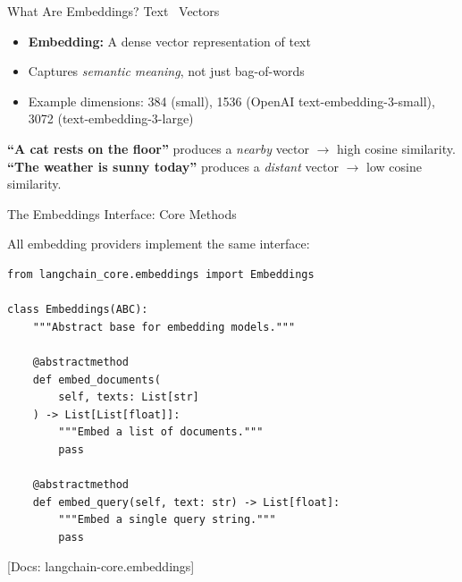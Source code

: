 \documentclass[aspectratio=169,11pt]{beamer}
\newcommand{\docref}[1]{{\scriptsize\color{docgray}[Docs: #1]}}
\begin{document}
\begin{frame}{What Are Embeddings? Text \textrightarrow\ Vectors}
  \begin{itemize}
    \setlength{\itemsep}{1pt}
    \item \textbf{Embedding:} A dense vector representation of text
    \item Captures \emph{semantic meaning}, not just bag-of-words
    \item Example dimensions: 384 (small), 1536 (OpenAI text-embedding-3-small), 3072 (text-embedding-3-large)
  \end{itemize}

  \vspace{0.05cm}
  \begin{center}
  \end{center}

  \vspace{0.05cm}
  \begin{tipbox}
    \textbf{``A cat rests on the floor''} produces a \emph{nearby} vector $\rightarrow$ high cosine similarity.\\
    \textbf{``The weather is sunny today''} produces a \emph{distant} vector $\rightarrow$ low cosine similarity.
  \end{tipbox}
\end{frame}

\begin{frame}[fragile,shrink=15]{The Embeddings Interface: Core Methods}
  \begin{conceptbox}
    All embedding providers implement the same interface:
  \end{conceptbox}

  \begin{lstlisting}
from langchain_core.embeddings import Embeddings

class Embeddings(ABC):
    """Abstract base for embedding models."""

    @abstractmethod
    def embed_documents(
        self, texts: List[str]
    ) -> List[List[float]]:
        """Embed a list of documents."""
        pass

    @abstractmethod
    def embed_query(self, text: str) -> List[float]:
        """Embed a single query string."""
        pass
  \end{lstlisting}

  \vspace{0.07cm}
  \docref{langchain-core.embeddings}
\end{frame}
\end{document}
